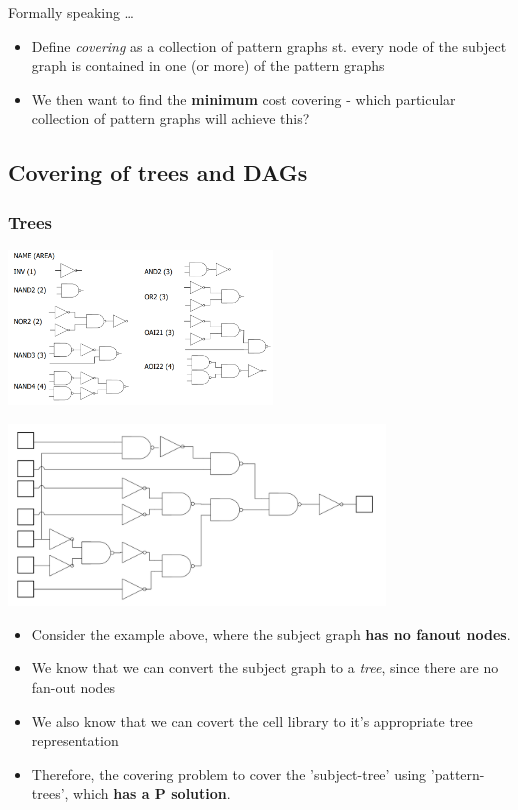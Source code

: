 \documentclass{article}
\begin{document}
Formally speaking \dots
\begin{itemize}
    \item Define \textit{covering} as a collection of pattern graphs st. every node of the subject graph is contained in one (or more) of the pattern graphs
    \item We then want to find the \textbf{minimum} cost covering - which particular collection of pattern graphs will achieve this?
\end{itemize}

\subsection{Covering of trees and DAGs}
\subsubsection{Trees}

\begin{minipage}[c]{0.5\textwidth}
    \centering
    \includegraphics[width=7cm, scale=1]{S4/pattern_library.PNG}
    \captionsetup{justification=centering}
\end{minipage}%
\begin{minipage}[c]{0.5\textwidth}
    \centering
    \includegraphics[width=10cm, scale=1]{S6/subject_noFanOut.PNG}
    \captionsetup{justification=centering}
\end{minipage}%

\begin{itemize}
    \item Consider the example above, where the subject graph \textbf{has no fanout nodes}.
    \item We know that we can convert the subject graph to a \textit{tree}, since there are no fan-out nodes
    \item We also know that we can covert the cell library to it's appropriate tree representation
    \item Therefore, the covering problem to cover the 'subject-tree' using 'pattern-trees', which \textbf{has a P solution}.
\end{itemize}
\end{document}
